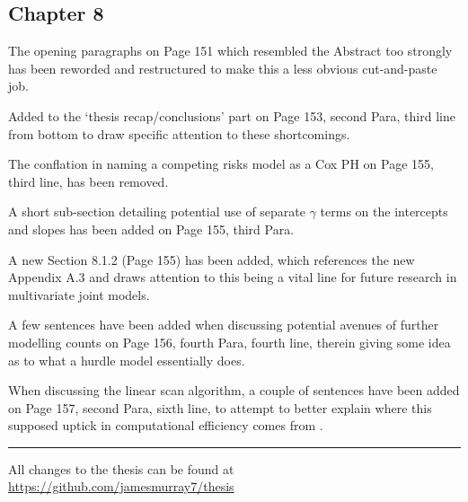 \documentclass{article}
\begin{document}
\subsection*{Chapter 8}
The opening paragraphs on Page 151 which resembled the Abstract too strongly has been reworded and restructured to make this a less obvious cut-and-paste job.

Added  to the `thesis recap/conclusions' part on Page 153, second Para, third line from bottom to draw specific attention to these shortcomings.

The conflation in naming a competing risks model as a Cox PH on Page 155, third line, has been removed.

A short sub-section detailing potential use of separate $\gamma$ terms on the intercepts and slopes  has been added on Page 155, third Para.

A new Section 8.1.2  (Page 155) has been added, which references the new Appendix A.3 and draws attention to this being a vital line for future research in multivariate joint models.

A few sentences have been added when discussing potential avenues of further modelling counts  on Page 156, fourth Para, fourth line, therein giving some idea as to what a hurdle model essentially does.

When discussing the linear scan algorithm, a couple of sentences have been added on Page 157, second Para, sixth line, to attempt to better explain where this supposed uptick in computational efficiency comes from .

\vspace{3.5mm}
\hrule
\vspace{4pt}
All changes to the thesis can be found at \url{https://github.com/jamesmurray7/thesis}
\end{document}
